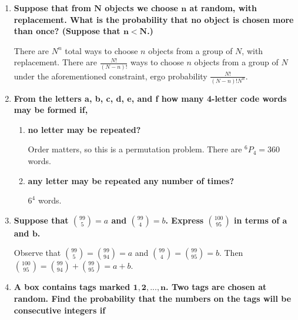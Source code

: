 \documentclass[10pt, oneside]{article}   	%
\newcommand*{\Perm}[2]{{}^{#1}\!P_{#2}}%
\theoremstyle{definition}
\begin{document}
\begin{enumerate}[label=2.\arabic*]
\begin{enumerate}
	\end{enumerate}
\item \begin{tcolorbox}[
  colback=Cerulean!5!white,
  colframe=Cerulean!75!black]
  \textbf{Suppose that from $\bm{N}$ objects we choose $\bm{n}$ at random, with replacement. What is the probability that no object is chosen more than once? (Suppose that $\bm{n < N}$.)}
  \end{tcolorbox}
  
  There are $N^n$ total ways to choose $n$ objects from a group of $N$, with replacement. There are $\frac{N!}{(N-n)!}$ ways to choose $n$ objects from a group of $N$ under the aforementioned constraint, ergo probability $\boxed{ \frac{N!}{(N-n)! N^n }} $.
\item \begin{tcolorbox}[
  colback=Cerulean!5!white,
  colframe=Cerulean!75!black]
  \textbf{From the letters a, b, c, d, e, and f how many 4-letter code words may be formed if,}
  \end{tcolorbox}
  
  	\begin{enumerate}
	\item \begin{tcolorbox}[
  colback=Cerulean!5!white,
  colframe=Cerulean!75!black]
  \textbf{no letter may be repeated?}
  \end{tcolorbox}
  
  Order matters, so this is a permutation problem. There are $\Perm{6}{4} = \boxed{360}$ words.
  	\item \begin{tcolorbox}[
  colback=Cerulean!5!white,
  colframe=Cerulean!75!black]
  \textbf{any letter may be repeated any number of times?}
  \end{tcolorbox}
  
  $\boxed{6^4}$ words.
	\end{enumerate}
\item \begin{tcolorbox}[
  colback=Cerulean!5!white,
  colframe=Cerulean!75!black]
  \textbf{Suppose that $\binom{99}{5} = a$ and $ \binom{99}{4} = b$. Express $\binom{100}{95} $ in terms of $\bm{a}$ and $\bm{b}$.}
  \end{tcolorbox}
  
  Observe that $\binom{99}{5} = \binom{99}{94} = a$ and $\binom{99}{4} = \binom{99}{95} = b$. Then $\binom{100}{95} = \binom{99}{94} + \binom{99}{95} = \boxed{a + b}$.
\item \begin{tcolorbox}[
  colback=Cerulean!5!white,
  colframe=Cerulean!75!black]
  \textbf{A box contains tags marked $\bm{1, 2, ..., n}$. Two tags are chosen at random. Find the probability that the numbers on the tags will be consecutive integers if}
  \end{tcolorbox}
  

\end{enumerate}
\end{document}
